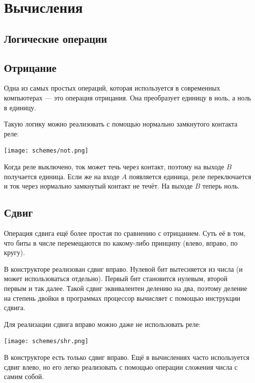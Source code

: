 
\chapter{Вычисления}

\section{Логические операции}


\section{Отрицание}

Одна из самых простых операций, которая используется в современных
компьютерах --- это операция отрицания. Она преобразует единицу
в ноль, а ноль в единицу.

Такую логику можно реализовать с помощью нормально замкнутого контакта реле:

\begin{center}
\texttt{[image: schemes/not.png]}
\end{center}

Когда реле выключено, ток может течь через контакт, поэтому на выходе $B$
получается единица. Если же на входе $A$ появляется единица, реле переключается
и ток через нормально замкнутый контакт не течёт. На выходе $B$ теперь ноль.

\section{Сдвиг}

Операция сдвига ещё более простая по сравнению с отрицанием.
Суть её в том, что биты в числе перемещаются по какому-либо
принципу (влево, вправо, по кругу).

В конструкторе реализован сдвиг вправо.
Нулевой бит вытесняется из числа (и может использоваться отдельно).
Первый бит становится нулевым, второй первым и так далее.
Такой сдвиг эквивалентен делению на два, поэтому деление на степень двойки в программах
процессор вычисляет с помощью инструкции сдвига.

Для реализации сдвига вправо можно даже не использовать реле:

\begin{center}
\texttt{[image: schemes/shr.png]}
\end{center}

В конструкторе есть только сдвиг вправо. Ещё в вычислениях часто используется
сдвиг влево, но его легко реализовать с помощью операции сложения
числа с самим собой.

